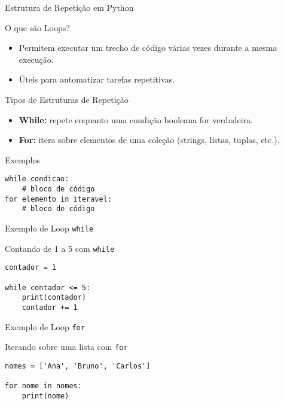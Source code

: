 \begin{frame}[fragile]{Estrutura de Repetição em Python}

\begin{block}{O que são Loops?}
\begin{itemize}
    \item Permitem executar um trecho de código várias vezes durante a mesma execução.
    \item Úteis para automatizar tarefas repetitivas.
\end{itemize}
\end{block}

\vspace{0.5em}

\begin{block}{Tipos de Estruturas de Repetição}
\begin{itemize}
    \item \textbf{While:} repete enquanto uma condição booleana for verdadeira.
    \item \textbf{For:} itera sobre elementos de uma coleção (strings, listas, tuplas, etc.).
\end{itemize}
\end{block}

\vspace{0.5em}

\begin{block}{Exemplos}
\begin{verbatim}
while condicao:
    # bloco de código
for elemento in iteravel:
    # bloco de código
\end{verbatim}
\end{block}

\end{frame}


\begin{frame}[fragile]{Exemplo de Loop \texttt{while}}

\begin{block}{Contando de 1 a 5 com \texttt{while}}
\begin{verbatim}
contador = 1

while contador <= 5:
    print(contador)
    contador += 1
\end{verbatim}
\end{block}

\end{frame}


\begin{frame}[fragile]{Exemplo de Loop \texttt{for}}

\begin{block}{Iterando sobre uma lista com \texttt{for}}
\begin{verbatim}
nomes = ['Ana', 'Bruno', 'Carlos']

for nome in nomes:
    print(nome)
\end{verbatim}
\end{block}

\end{frame}

